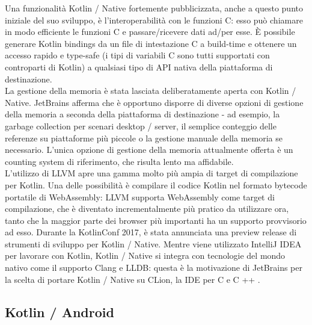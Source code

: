 Una funzionalità Kotlin / Native fortemente pubblicizzata, anche a questo punto iniziale del suo sviluppo, è l'interoperabilità con le funzioni C: esso può chiamare in modo efficiente le funzioni C e passare/ricevere dati ad/per esse. È possibile generare Kotlin bindings da un file di intestazione C a build-time e ottenere un accesso rapido e type-safe (i tipi di variabili C sono tutti supportati con controparti di Kotlin) a qualsiasi tipo di API nativa della piattaforma di destinazione.\\
La gestione della memoria è stata lasciata deliberatamente aperta con Kotlin / Native. JetBrains afferma che è opportuno disporre di diverse opzioni di gestione della memoria a seconda della piattaforma di destinazione - ad esempio, la garbage collection per scenari desktop / server, il semplice conteggio delle referenze su piattaforme più piccole o la gestione manuale della memoria se necessario. L'unica opzione di gestione della memoria attualmente offerta è un counting system di riferimento, che risulta lento ma affidabile.\\

L'utilizzo di LLVM apre una gamma molto più ampia di target di compilazione per Kotlin. Una delle possibilità è compilare il codice Kotlin nel formato bytecode portatile di WebAssembly: LLVM supporta WebAssembly come target di compilazione, che è diventato incrementalmente più pratico da utilizzare ora, tanto che la maggior parte dei browser più importanti ha un supporto provvisorio ad esso.
Durante la KotlinConf 2017, è stata annunciata una preview release di strumenti di sviluppo per Kotlin / Native. Mentre viene utilizzato IntelliJ IDEA per lavorare con Kotlin, Kotlin / Native si integra con tecnologie del mondo nativo come il supporto Clang e LLDB: questa è la motivazione di JetBrains per la scelta di portare Kotlin / Native su CLion, la IDE per C e C ++ \cite{kotlinNativeIDESupport}.\\

\subsection{Kotlin / Android}

